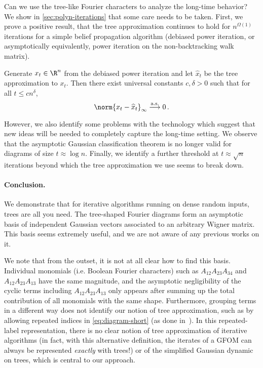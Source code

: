 \documentclass[12pt]{article}
\renewcommand{\toas}{\overset{\textnormal{a.s.}}{\longrightarrow}}
\begin{document}
Can we use the tree-like Fourier characters to analyze the long-time behavior?
We show in \cref{sec:polyn-iterations} that some care needs to be taken.
First, we prove a positive result, that the tree approximation continues to hold for $n^{\Omega(1)}$ iterations for a simple belief propagation algorithm (debiased power iteration, or asymptotically equivalently, power iteration on the non-backtracking walk matrix).

\begin{theorem}
Generate $x_t \in \R^n$ from the debiased power iteration and let $\widehat{x}_t$ be the tree approximation to $x_t$.
Then there exist universal constants $c, \delta > 0$ such that for all $t \leq cn^\delta$,
\[\norm{x_t - \widehat{x}_t}_\infty \toas 0\,.\]
\end{theorem}

However, we also identify some problems with the technology which suggest that new ideas will be needed to completely capture the long-time setting. We observe that the asymptotic Gaussian classification theorem is no longer valid for diagrams of size $t \approx \log n$.
Finally, we identify a further threshold at $t \approx \sqrt{n}$ iterations
beyond which the tree approximation we use seems to break down.

\vspace{-7pt}
\paragraph{Conclusion.}
We demonstrate that for iterative algorithms
running on dense random inputs,
{trees are all you need}.
The tree-shaped Fourier diagrams form
an asymptotic
basis of independent Gaussian vectors
associated to an arbitrary Wigner matrix.
This basis seems extremely useful, and
we are not aware of any previous works on it.


We note that from the outset, it is not at all clear
how to find this basis. Individual monomials (i.e. Boolean Fourier characters) such as $A_{12}A_{23}A_{34}$ and $A_{12}A_{23}A_{13}$ have the same magnitude, and the asymptotic negligibility of the cyclic terms including $A_{12}A_{23}A_{13}$ only appears after summing up
the total contribution of all monomials with the same shape. Furthermore, grouping
terms in a different way does not identify our notion of tree approximation,
such as by allowing
repeated indices in \cref{eq:diagram-short}
(as done in~\cite{bayati2015universality,ivkov2023semidefinite}).
In this repeated-label representation, there
is no clear notion of tree approximation of
iterative algorithms (in fact, with this alternative definition, the iterates of
a GFOM can always
be represented {\em exactly} with trees!)
or of the simplified Gaussian dynamic on trees, which is central
to our approach.
\end{document}
